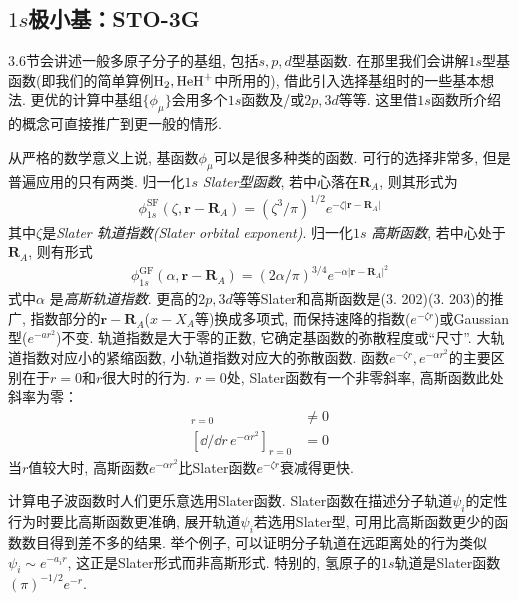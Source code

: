 \subsection{$1s$极小基：STO-3G}
\label{sec3.5.1}
3.6节会讲述一般多原子分子的基组, 包括$s,p,d$型基函数. 
在那里我们会讲解$1s$型基函数(即我们的简单算例$\mathrm{H}_2,\mathrm{HeH}^+$中所用的), 借此引入选择基组时的一些基本想法. 
更优的计算中基组$\{\phi_\mu\}$会用多个$1s$函数及/或$2p,3d$等等. 
这里借$1s$函数所介绍的概念可直接推广到更一般的情形.

从严格的数学意义上说, 
基函数$\phi_\mu$可以是很多种类的函数. 
可行的选择非常多, 
但是普遍应用的只有两类. 
归一化$1s$ \emph{Slater型函数}, 
若中心落在$\mathbf{R}_A$, 
则其形式为
\begin{align}
	\phi_{1s}^\mathrm{SF}(\zeta,\mathbf{r-R}_A) = (\zeta^3/\pi)^{1/2}e^{-\zeta|\mathbf{r-R}_A|}
\end{align}
其中$\zeta$是\emph{Slater 轨道指数(Slater orbital exponent)}. 
归一化$1s$ \emph{高斯函数}, 
若中心处于$\mathbf{R}_A$, 
则有形式
\begin{align}
	\phi_{1s}^\mathrm{GF}(\alpha,\mathbf{r-R}_A) = (2\alpha/\pi)^{3/4}e^{-\alpha|\mathbf{r-R}_A|^2}
\end{align}
式中$\alpha$ 是\emph{高斯轨道指数}. 
更高的$2p,3d$等等Slater和高斯函数是(3.
202)(3.
203)的推广, 
指数部分的$\mathbf{r-R}_A$($x-X_A$等)换成多项式, 
而保持速降的指数($e^{-\zeta r}$)或Gaussian型($e^{-ar^2}$)不变. 
轨道指数是大于零的正数, 
它确定基函数的弥散程度或``尺寸''. 
大轨道指数对应小的紧缩函数, 
小轨道指数对应大的弥散函数. 
函数$e^{-\zeta r},e^{-\alpha r^2}$的主要区别在于$r=0$和$r$很大时的行为. 
$r=0$处, 
Slater函数有一个非零斜率, 
高斯函数此处斜率为零：
\begin{align}
	[\dd/\dd r\, e^{-\zeta r}]_{r=0}& \neq 0\\
	[\dd/\dd r\, e^{-\alpha r^2}]_{r=0}&  =   0
\end{align}
当$r$值较大时, 
高斯函数$e^{-\alpha r^2}$比Slater函数$e^{-\zeta r}$衰减得更快.


计算电子波函数时人们更乐意选用Slater函数. 
Slater函数在描述分子轨道$\psi_i$的定性行为时要比高斯函数更准确, 
展开轨道$\psi_i$若选用Slater型, 
可用比高斯函数更少的函数数目得到差不多的结果. 
举个例子, 
可以证明分子轨道在远距离处的行为类似$\psi_i\sim e^{-a_ir}$, 
这正是Slater形式而非高斯形式. 
特别的, 
氢原子的$1s$轨道是Slater函数$(\pi)^{-1/2}e^{-r}$.


